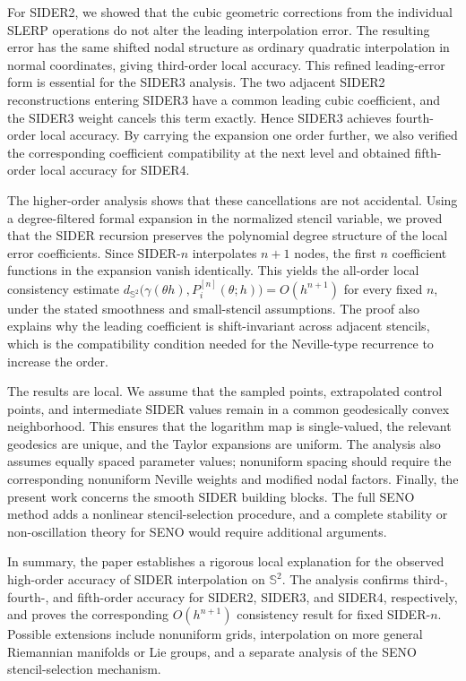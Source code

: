 \documentclass[a4paper,11pt]{article}
\newcommand{\bS}{\mathbb{S}}
\numberwithin{equation}{section}
\begin{document}
For SIDER2, we showed that the cubic geometric corrections from the individual
SLERP operations do not alter the leading interpolation error.  The resulting
error has the same shifted nodal structure as ordinary quadratic interpolation
in normal coordinates, giving third-order local accuracy.  This refined
leading-error form is essential for the SIDER3 analysis.  The two adjacent
SIDER2 reconstructions entering SIDER3 have a common leading cubic coefficient,
and the SIDER3 weight cancels this term exactly.  Hence SIDER3 achieves
fourth-order local accuracy.  By carrying the expansion one order further, we
also verified the corresponding coefficient compatibility at the next level and
obtained fifth-order local accuracy for SIDER4.

The higher-order analysis shows that these cancellations are not accidental.
Using a degree-filtered formal expansion in the normalized stencil variable, we
proved that the SIDER recursion preserves the polynomial degree structure of
the local error coefficients.  Since SIDER-\(n\) interpolates \(n+1\) nodes,
the first \(n\) coefficient functions in the expansion vanish identically.
This yields the all-order local consistency estimate
$        d_{\bS^2}\bigl(\gamma(\theta h),P_i^{[n]}(\theta;h)\bigr)
        =
        O(h^{n+1})$
for every fixed \(n\), under the stated smoothness and small-stencil
assumptions.  The proof also explains why the leading coefficient is
shift-invariant across adjacent stencils, which is the compatibility condition
needed for the Neville-type recurrence to increase the order.

The results are local.  We assume that the sampled points, extrapolated control
points, and intermediate SIDER values remain in a common geodesically convex
neighborhood.  This ensures that the logarithm map is single-valued, the
relevant geodesics are unique, and the Taylor expansions are uniform.  The
analysis also assumes equally spaced parameter values; nonuniform spacing
should require the corresponding nonuniform Neville weights and modified nodal
factors.  Finally, the present work concerns the smooth SIDER building blocks.
The full SENO method adds a nonlinear stencil-selection procedure, and a
complete stability or non-oscillation theory for SENO would require additional
arguments.

In summary, the paper establishes a rigorous local explanation for the observed
high-order accuracy of SIDER interpolation on \(\bS^2\).  The analysis confirms
third-, fourth-, and fifth-order accuracy for SIDER2, SIDER3, and SIDER4,
respectively, and proves the corresponding \(O(h^{n+1})\) consistency result
for fixed SIDER-\(n\).  Possible extensions include nonuniform grids,
interpolation on more general Riemannian manifolds or Lie groups, and a
separate analysis of the SENO stencil-selection mechanism.
\end{document}
